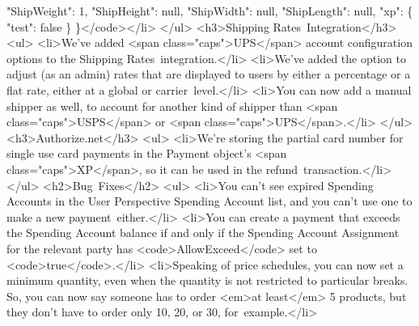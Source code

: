 \documentclass{memoir}%
\begin{document}
        "ShipWeight": 1,\newline%
        "ShipHeight": null,\newline%
        "ShipWidth": null,\newline%
        "ShipLength": null,\newline%
        "xp": \{\newline%
          "test": false\newline%
        \}\newline%
      \}</code></li>\newline%
</ul>\newline%
<h3>Shipping Rates~Integration</h3>\newline%
<ul>\newline%
<li>We’ve added <span class="caps">UPS</span> account configuration options to the Shipping Rates~integration.</li>\newline%
<li>We’ve added the option to adjust (as an admin) rates that are displayed to users by either a percentage or a flat rate, either at a global or carrier~level.</li>\newline%
<li>You can now add a manual shipper as well, to account for another kind of shipper than <span class="caps">USPS</span> or <span class="caps">UPS</span>.</li>\newline%
</ul>\newline%
<h3>Authorize.net</h3>\newline%
<ul>\newline%
<li>We’re storing the partial card number for single use card payments in the Payment object’s <span class="caps">XP</span>, so it can be used in the refund~transaction.</li>\newline%
</ul>\newline%
<h2>Bug~Fixes</h2>\newline%
<ul>\newline%
<li>You can’t see expired Spending Accounts in the User Perspective Spending Account list, and you can’t use one to make a new payment~either.</li>\newline%
<li>You can create a payment that exceeds the Spending Account balance if and only if the Spending Account Assignment for the relevant party has <code>AllowExceed</code> set to <code>true</code>.</li>\newline%
<li>Speaking of price schedules, you can now set a minimum quantity, even when the quantity is not restricted to particular breaks. So, you can now say someone has to order <em>at least</em> 5 products, but they don’t have to order only 10, 20, or 30, for~example.</li>\newline%
\end{document}
